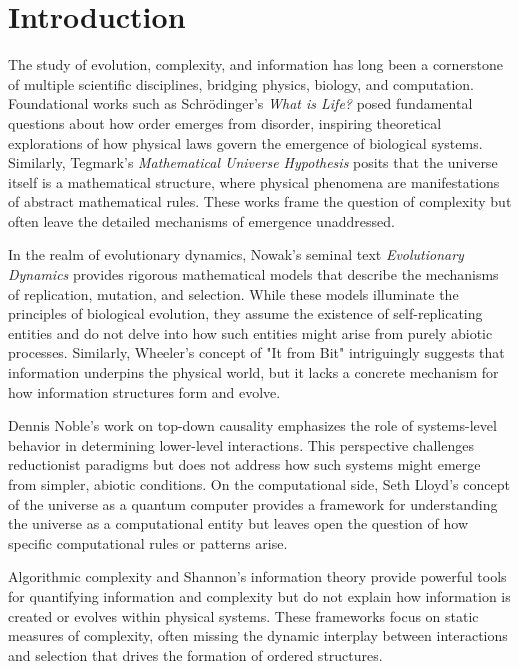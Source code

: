 \documentclass[entropy,article,submit,pdftex,moreauthors]{Definitions/mdpi}
\begin{document}


\section{Introduction}

The study of evolution, complexity, and information has long been a cornerstone of multiple scientific disciplines, bridging physics, biology, and computation. Foundational works such as Schrödinger's \textit{What is Life?} \cite{schrodinger1944life} posed fundamental questions about how order emerges from disorder, inspiring theoretical explorations of how physical laws govern the emergence of biological systems. Similarly, Tegmark's \textit{Mathematical Universe Hypothesis} \cite{tegmark2008mathematical} posits that the universe itself is a mathematical structure, where physical phenomena are manifestations of abstract mathematical rules. These works frame the question of complexity but often leave the detailed mechanisms of emergence unaddressed.

In the realm of evolutionary dynamics, Nowak's seminal text \textit{Evolutionary Dynamics} \cite{nowak2006evolutionary} provides rigorous mathematical models that describe the mechanisms of replication, mutation, and selection. While these models illuminate the principles of biological evolution, they assume the existence of self-replicating entities and do not delve into how such entities might arise from purely abiotic processes. Similarly, Wheeler's concept of "It from Bit" \cite{wheeler1990itbit} intriguingly suggests that information underpins the physical world, but it lacks a concrete mechanism for how information structures form and evolve.

Dennis Noble's work on top-down causality \cite{noble2012causality} emphasizes the role of systems-level behavior in determining lower-level interactions. This perspective challenges reductionist paradigms but does not address how such systems might emerge from simpler, abiotic conditions. On the computational side, Seth Lloyd’s concept of the universe as a quantum computer \cite{lloyd2006programming} provides a framework for understanding the universe as a computational entity but leaves open the question of how specific computational rules or patterns arise.

Algorithmic complexity and Shannon’s information theory \cite{shannon1948mathematical} provide powerful tools for quantifying information and complexity but do not explain how information is created or evolves within physical systems. These frameworks focus on static measures of complexity, often missing the dynamic interplay between interactions and selection that drives the formation of ordered structures.
\end{document}
